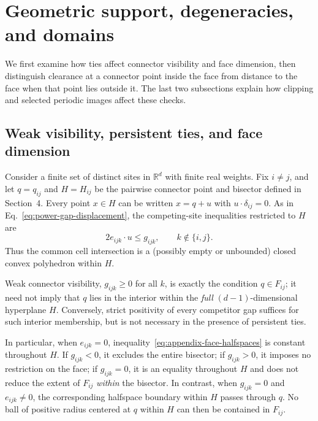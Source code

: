 \section{Geometric support, degeneracies, and domains}
\label{app:geometric-details}

We first examine how ties affect connector visibility and face dimension, then distinguish clearance at a connector point inside the face from distance to the face when that point lies outside it. The last two subsections explain how clipping and selected periodic images affect these checks.


\subsection{Weak visibility, persistent ties, and face dimension}
\label{app:geometry-degeneracy}

Consider a finite set of distinct sites in $\mathbb R^d$ with finite real weights. Fix $i\ne j$, and let $q=q_{ij}$ and $H=H_{ij}$ be the pairwise connector point and bisector defined in Section~4. Every point $x\in H$ can be written $x=q+u$ with $u\cdot\delta_{ij}=0$. As in Eq.~\eqref{eq:power-gap-displacement}, the competing-site inequalities restricted to $H$ are
\begin{equation}
2e_{ijk}\cdot u\le g_{ijk},
\qquad k\notin\{i,j\}.
\label{eq:appendix-face-halfspaces}
\end{equation}
Thus the common cell intersection is a (possibly empty or unbounded) closed convex polyhedron within $H$.

Weak connector visibility, $g_{ijk}\ge0$ for all $k$, is exactly the condition $q\in F_{ij}$; it need not imply that $q$ lies in the interior within the \emph{full} $(d-1)$-dimensional hyperplane $H$. Conversely, strict positivity of every competitor gap suffices for such interior membership, but is not necessary in the presence of persistent ties.

In particular, when $e_{ijk}=0$, inequality~\eqref{eq:appendix-face-halfspaces} is constant throughout $H$. If $g_{ijk}<0$, it excludes the entire bisector; if $g_{ijk}>0$, it imposes no restriction on the face; if $g_{ijk}=0$, it is an equality throughout $H$ and does not reduce the extent of $F_{ij}$ \emph{within} the bisector. In contrast, when $g_{ijk}=0$ and $e_{ijk}\ne0$, the corresponding halfspace boundary within $H$ passes through $q$. No ball of positive radius centered at $q$ within $H$ can then be contained in $F_{ij}$.

